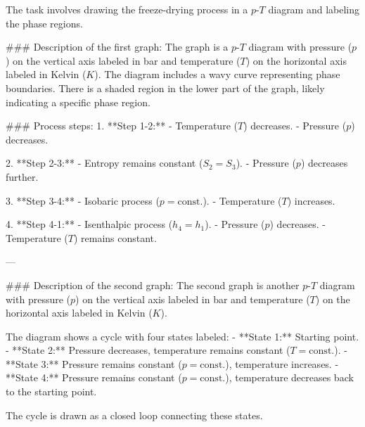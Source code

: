 The task involves drawing the freeze-drying process in a \( p \)-\( T \) diagram and labeling the phase regions.  

### Description of the first graph:  
The graph is a \( p \)-\( T \) diagram with pressure (\( p \)) on the vertical axis labeled in bar and temperature (\( T \)) on the horizontal axis labeled in Kelvin (\( K \)). The diagram includes a wavy curve representing phase boundaries. There is a shaded region in the lower part of the graph, likely indicating a specific phase region.  

### Process steps:  
1. **Step 1-2:**  
   - Temperature (\( T \)) decreases.  
   - Pressure (\( p \)) decreases.  

2. **Step 2-3:**  
   - Entropy remains constant (\( S_2 = S_3 \)).  
   - Pressure (\( p \)) decreases further.  

3. **Step 3-4:**  
   - Isobaric process (\( p = \text{const.} \)).  
   - Temperature (\( T \)) increases.  

4. **Step 4-1:**  
   - Isenthalpic process (\( h_4 = h_1 \)).  
   - Pressure (\( p \)) decreases.  
   - Temperature (\( T \)) remains constant.  

---

### Description of the second graph:  
The second graph is another \( p \)-\( T \) diagram with pressure (\( p \)) on the vertical axis labeled in bar and temperature (\( T \)) on the horizontal axis labeled in Kelvin (\( K \)).  

The diagram shows a cycle with four states labeled:  
- **State 1:** Starting point.  
- **State 2:** Pressure decreases, temperature remains constant (\( T = \text{const.} \)).  
- **State 3:** Pressure remains constant (\( p = \text{const.} \)), temperature increases.  
- **State 4:** Pressure remains constant (\( p = \text{const.} \)), temperature decreases back to the starting point.  

The cycle is drawn as a closed loop connecting these states.